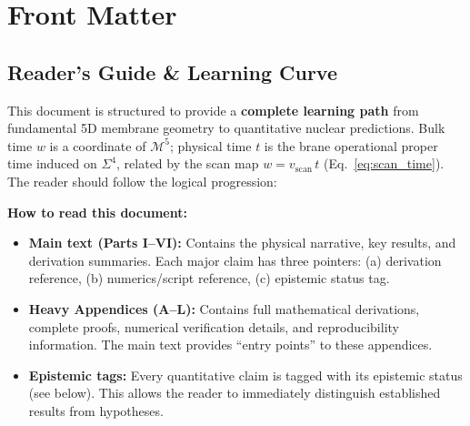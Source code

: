 \documentclass[11pt,a4paper]{article}
\begin{document}
\section*{Front Matter}

\subsection*{Reader's Guide \& Learning Curve}

This document is structured to provide a \textbf{complete learning path} from fundamental 5D membrane geometry to quantitative nuclear predictions.
Bulk time $w$ is a coordinate of $\mathcal{M}^5$; physical time $t$ is the brane operational proper time induced on $\Sigma^4$, related by the scan map $w = v_{\mathrm{scan}}\,t$ (Eq.~\ref{eq:scan_time}).
The reader should follow the logical progression:

\begin{center}
\end{center}

\textbf{How to read this document:}
\begin{itemize}
    \item \textbf{Main text (Parts I--VI):} Contains the physical narrative, key results, and derivation summaries. Each major claim has three pointers: (a) derivation reference, (b) numerics/script reference, (c) epistemic status tag.

    \item \textbf{Heavy Appendices (A--L):} Contains full mathematical derivations, complete proofs, numerical verification details, and reproducibility information. The main text provides ``entry points'' to these appendices.

    \item \textbf{Epistemic tags:} Every quantitative claim is tagged with its epistemic status (see below). This allows the reader to immediately distinguish established results from hypotheses.
\end{itemize}
\end{document}
